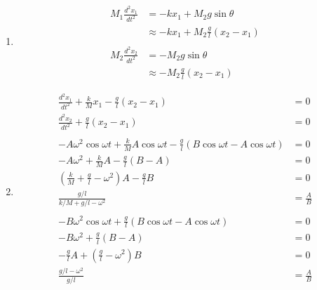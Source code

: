 \documentclass{article}
\begin{document}
\begin{enumerate}
  \item

        \begin{align*}
          M_1 \frac{d^2 x_1}{d t^2} & = -k x_1 + M_2 g \sin \theta                 \\
                                    & \approx -k x_1 + M_2 \frac{g}{l} (x_2 - x_1) \\ \\
          M_2 \frac{d^2 x_2}{d t^2} & = -M_2 g \sin \theta                         \\
                                    & \approx -M_2 \frac{g}{l} (x_2 - x_1)
        \end{align*}

  \item

        \begin{align*}
          \frac{d^2 x_1}{d t^2} + \frac{k}{M} x_1 - \frac{g}{l} (x_2 - x_1)                                         & = 0           \\
          \frac{d^2 x_2}{d t^2} + \frac{g}{l} (x_2 - x_1)                                                           & = 0           \\ \\
          -A \omega^2 \cos \omega t + \frac{k}{M} A \cos \omega t - \frac{g}{l} (B \cos \omega t - A \cos \omega t) & = 0           \\
          -A \omega^2 + \frac{k}{M} A - \frac{g}{l} (B - A)                                                         & = 0           \\
          \left( \frac{k}{M} + \frac{g}{l} - \omega^2 \right) A - \frac{g}{l} B                                     & = 0           \\
          \frac{g / l}{k / M + g / l - \omega^2}                                                                    & = \frac{A}{B} \\ \\
          -B \omega^2 \cos \omega t + \frac{g}{l} (B \cos \omega t - A \cos \omega t)                               & = 0           \\
          -B \omega^2 + \frac{g}{l} (B - A)                                                                         & = 0           \\
          -\frac{g}{l} A + \left( \frac{g}{l} - \omega^2 \right) B                                                  & = 0           \\
          \frac{g / l - \omega^2}{g / l}                                                                            & = \frac{A}{B} \\ \\
        \end{align*}


\end{enumerate}
\end{document}

